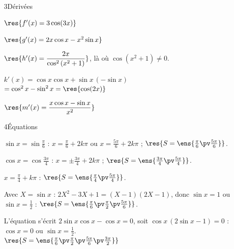 \begin{deuxcolonnes}
\begin{corrige}{3}{Dérivées}
\begin{questions}
  \item $\res{f'(x)=3\cos(3x)}$
  \item $\res{g'(x)=2x\cos x-x^{2}\sin x}$
  \item $\res{h'(x)=\dfrac{2x}{\cos^{2}\left(x^{2}+1\right)}}$, là où $\cos\left(x^{2}+1\right)\neq0$.
  \item $k'(x)=\cos x\cos x+\sin x\,(-\sin x)$\\ $=\cos^{2}x-\sin^{2}x=\res{\cos(2x)}$
  \item $\res{m'(x)=\dfrac{x\cos x-\sin x}{x^{2}}}$
\end{questions}
\end{corrige}

\begin{corrige}{4}{Équations}
\begin{questions}
  \item $\sin x=\sin\frac{\pi}{6}$ : $x=\frac{\pi}{6}+2k\pi$ ou $x=\frac{5\pi}{6}+2k\pi$ ; $\res{S=\ens{\frac{\pi}{6}\pv\frac{5\pi}{6}}}$.
  \item $\cos x=\cos\frac{3\pi}{4}$ : $x=\pm\frac{3\pi}{4}+2k\pi$ ; $\res{S=\ens{\frac{3\pi}{4}\pv\frac{5\pi}{4}}}$.
  \item $x=\frac{\pi}{4}+k\pi$ : $\res{S=\ens{\frac{\pi}{4}\pv\frac{5\pi}{4}}}$.
  \item Avec $X=\sin x$ : $2X^{2}-3X+1=(X-1)(2X-1)$, donc $\sin x=1$ ou $\sin x=\frac12$ : $\res{S=\ens{\frac{\pi}{6}\pv\frac{\pi}{2}\pv\frac{5\pi}{6}}}$.
  \item L'équation s'écrit $2\sin x\cos x-\cos x=0$, soit $\cos x\,(2\sin x-1)=0$ : $\cos x=0$ ou $\sin x=\frac12$.\\
    $\res{S=\ens{\frac{\pi}{6}\pv\frac{\pi}{2}\pv\frac{5\pi}{6}\pv\frac{3\pi}{2}}}$
\end{questions}
\end{corrige}


\end{deuxcolonnes}
